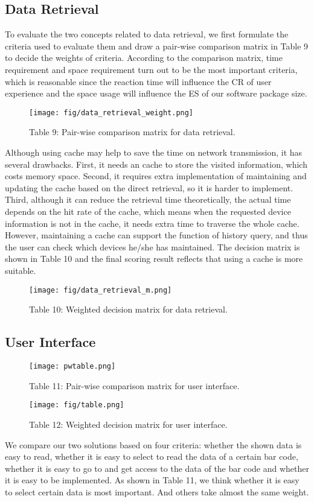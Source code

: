 \documentclass[11pt,a4paper]{article}
\begin{document}
\begin{onehalfspace}
\subsection{Data Retrieval}

To evaluate the two concepts related to data retrieval, we first formulate the criteria used to evaluate them and draw a pair-wise comparison matrix in Table 9 to decide the weights of criteria. According to the comparison matrix, time requirement and space requirement turn out to be the most important criteria, which is reasonable since the reaction time will influence the CR of user experience and the space usage will influence the ES of our software package size.

\begin{figure}[H]
    \centering
    \caption*{Table 9: Pair-wise comparison matrix for data retrieval.}
    \texttt{[image: fig/data\_retrieval\_weight.png]}
\end{figure}


Although using cache may help to save the time on network transmission, it has several drawbacks. First, it needs an cache to store the visited information, which costs memory space. Second, it requires extra implementation of maintaining and updating the cache based on the direct retrieval, so it is harder to implement. Third, although it can reduce the retrieval time theoretically, the actual time depends on the hit rate of the cache, which means when the requested device information is not in the cache, it needs extra time to traverse the whole cache. However, maintaining a cache can support the function of history query, and thus the user can check which devices he/she has maintained. The decision matrix is shown in Table 10 and the final scoring result reflects that using a cache is more suitable.

\begin{figure}[H]
    \centering
    \caption*{Table 10: Weighted decision matrix for data retrieval.}
    \texttt{[image: fig/data\_retrieval\_m.png]}
\end{figure}

\subsection{User Interface}
\begin{figure}[H]
    \centering
    \caption*{Table 11: Pair-wise comparison matrix for user interface.}
    \texttt{[image: pwtable.png]}
\end{figure}
\begin{figure}[H]
    \centering
    \caption*{Table 12: Weighted decision matrix for user interface.}
    \texttt{[image: fig/table.png]}
\end{figure}
We compare our two solutions based on four criteria: whether the shown data is easy to read, whether it is easy to select to read the data of a certain bar code, whether it is easy to go to and get access to the data of the bar code and whether it is easy to be implemented. As shown in Table 11, we think whether it is easy to select certain data is most important. And others take almost the same weight.


\end{onehalfspace}
\end{document}
